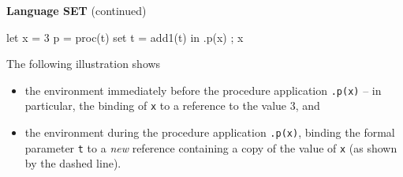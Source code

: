 \begin{minipage}[t]{\sw}
\slidenumber
\LARGE
{\bf Language SET} (continued)
\begin{qv}
let
  x = 3
  p = proc(t) set t = add1(t)
in
  { .p(x) ; x }
\end{qv}
The following illustration shows
\begin{itemize}
\item
the environment immediately before
the procedure application \verb'.p(x)' -- in particular,
the binding of \verb'x' to a reference to the value 3, and
\item
the environment during the procedure application \verb'.p(x)',
binding the formal parameter \verb't'
to a {\em new} reference 
containing a copy of the value of \verb'x'
(as shown by the dashed line).
\end{itemize}
\end{minipage}
\clearpage
